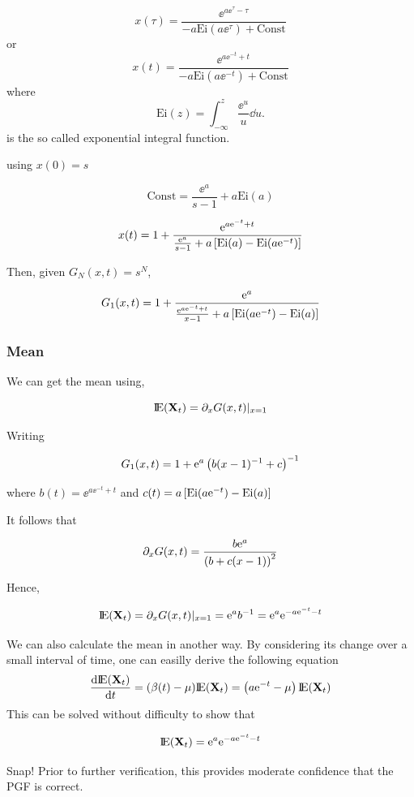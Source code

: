$$x(\tau) = \frac{\ee^{a\ee^\tau - \tau}}{ - a\text{Ei}(a\ee^\tau) + \text{Const}}$$
or
$$x(t) = \frac{\ee^{a\ee^{-t} + t}}{ - a\text{Ei}(a\ee^{-t}) + \text{Const}}$$
where 
$$\text{Ei}(z) =  \int^z_{-\infty} \frac{\ee^u}{u}\dd u.$$
is the so called exponential integral function. 

using $x(0) = s$

$$\text{Const} = \frac{\ee^a}{s -1} + a \text{Ei}(a)$$ 

$$x(t) = 1 + \frac{{\rm e}^{a {\rm e}^{-t} + t }}{  \frac{{\rm e}^a}{s-1}  + a\left[\text{Ei}(a) - \text{Ei}(a{\rm e}^{-t})   \right]  }$$

Then, given $G_N(x,t) = s^N$,


$$G_1(x,t) = 1 + \frac{{\rm e}^a}{  \frac{{\rm e}^{a {\rm e}^{-t} + t }}{x - 1}  +     a\left[   \text{Ei}(a{\rm e}^{-t})  - \text{Ei}(a)  \right]       }$$







\subsubsection{Mean}


We can get the mean using,

$${\rm I}\!{\rm E}({{\bf X}_t}) = \partial_x G(x,t)\large |_{x=1}$$


Writing 

$$G_1(x,t) = 1 +       {\rm e}^a \left( b (x-1)^{-1}  + c\right)^{-1}$$

where $b(t) = \ee^{a \ee^{-t} + t } $ and $c(t) =  a\left[   \text{Ei}(a{\rm e}^{-t})  - \text{Ei}(a)  \right]   $

It follows that 

$$\partial_x G(x,t) = \frac{b{\rm e}^a}{  \left( b + c (x-1)  \right) ^2}$$

Hence,

$${\rm I}\!{\rm E}({{\bf X}_t}) = \partial_x G(x,t) \large|_{x=1} = {\rm e}^a b^{-1} = {\rm e}^a {\rm e}^{-a{\rm e}^{-t}  - t}$$



We can also calculate the mean in another way. By considering its change over a small interval of time, one can easilly derive the following equation
$$\displaystyle\frac{{\rm d} {\rm I}\!{\rm E}({{\bf X}_t})}{{\rm d} t} = (\beta(t) - \mu){\rm I}\!{\rm E}({{\bf X}_t}) = \left( a{\rm e}^{-t} - \mu\right) {\rm I}\!{\rm E}({{\bf X}_t})$$
This can be solved without difficulty to show that 

$${\rm I}\!{\rm E}({{\bf X}_t})  = {\rm e}^a {\rm e}^{-a{\rm e}^{-t}  - t}$$

Snap! Prior to further verification, this provides moderate confidence that the PGF is correct. 





